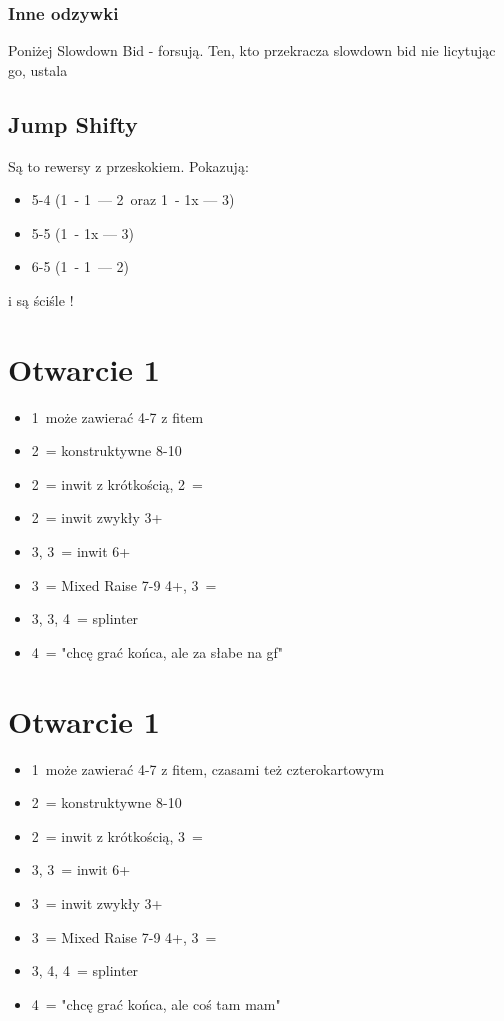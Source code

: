 \documentclass[12pt, a4paper]{article}
\begin{document}
\subsubsection*{Inne odzywki}
Poniżej Slowdown Bid - forsują. Ten, kto przekracza slowdown bid nie licytując go, ustala \gf

\subsection*{Jump Shifty}
Są to rewersy z przeskokiem. Pokazują:
\begin{itemize}
    \item 5-4 (1\minor\ - 1\hearts\ --- 2\spades\ oraz 1\diams\ - 1x --- 3\clubs)
    \item 5-5 (1\major\ - 1x --- 3\minor)
    \item 6-5 (1\hearts\ - 1\nt\ --- 2\spades) \imp
\end{itemize} 
i są ściśle \gf!



\pagebreak
\section{Otwarcie 1\hearts}
\begin{itemize}
    \item 1\nt\ może zawierać 4-7 z fitem
    \item 2\hearts\ = konstruktywne 8-10
    \item 2\spades\ = inwit z krótkością, 2\nt\ = \lsf
    \item 2\nt\ = inwit zwykły 3+\hearts
    \item 3\clubs, 3\diams\ = inwit 6+\minor
    \item 3\hearts\ = Mixed Raise 7-9 4+\hearts, 3\spades\ = \lsf
    \item 3\spades, 3\nt, 4\clubs\ = splinter
    \item 4\diams\ = "chcę grać końca, ale za słabe na gf"
\end{itemize}

\section{Otwarcie 1\spades}
\begin{itemize}
    \item 1\nt\ może zawierać 4-7 z fitem, czasami też czterokartowym
    \item 2\spades\ = konstruktywne 8-10
    \item 2\nt\ = inwit z krótkością, 3\clubs\ = \lsf
    \item 3\clubs, 3\diams\ = inwit 6+\minor
    \item 3\hearts\ = inwit zwykły 3+\spades
    \item 3\spades\ = Mixed Raise 7-9 4+\spades, 3\nt\ = \lsf
    \item 3\nt, 4\clubs, 4\diams\ = splinter
    \item 4\hearts\ = "chcę grać końca, ale coś tam mam"
\end{itemize}
\end{document}
